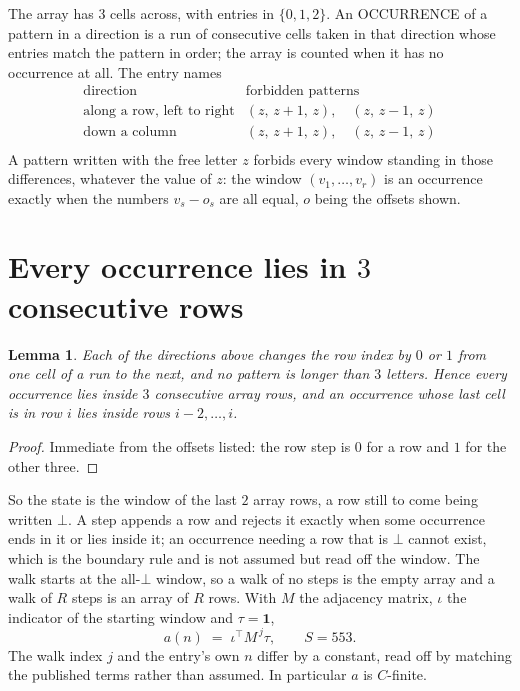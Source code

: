 \documentclass[11pt,a4paper]{article}
\theoremstyle{plain}
\newtheorem{lemma}[theorem]{Lemma}
\theoremstyle{definition}
\begin{document}
The array has $3$ cells across, with entries in $\{0,1,2\}$. An OCCURRENCE of a pattern in a
direction is a run of consecutive cells taken in that direction whose entries match the pattern
in order; the array is counted when it has no occurrence at all. The entry names
\[
\begin{array}{ll}
\text{direction} & \text{forbidden patterns} \\[2pt]
\text{along a row, left to right} & (z,\,z+1,\,z),\quad (z,\,z-1,\,z) \\
\text{down a column} & (z,\,z+1,\,z),\quad (z,\,z-1,\,z) \\
\end{array}
\]
 A pattern written with the free letter $z$ forbids every window standing in those differences, whatever the value of $z$: the window $(v_1,\dots,v_r)$ is an occurrence exactly when the numbers $v_s-o_s$ are all equal, $o$ being the offsets shown.

\section{Every occurrence lies in $3$ consecutive rows}

\begin{lemma}\label{lem:win}
Each of the directions above changes the row index by $0$ or $1$ from one cell of a run to the
next, and no pattern is longer than $3$ letters. Hence every occurrence lies inside $3$
consecutive array rows, and an occurrence whose last cell is in row $i$ lies inside rows
$i-2,\dots,i$.
\end{lemma}

\begin{proof}
Immediate from the offsets listed: the row step is $0$ for a row and $1$ for the other three.
\end{proof}

So the state is the window of the last $2$ array rows, a row still to come being written
$\bot$. A step appends a row and rejects it exactly when some occurrence ends in it or lies
inside it; an occurrence needing a row that is $\bot$ cannot exist, which is the boundary rule
and is not assumed but read off the window. The walk starts at the all-$\bot$ window, so a walk
of no steps is the empty array and a walk of $R$ steps is an array of $R$ rows. With $M$ the
adjacency matrix, $\iota$ the indicator of the starting window and $\tau=\mathbf{1}$,
\[
a(n)\;=\;\iota^{\!\top}M^{\,j}\tau ,\qquad S=553.
\]
The walk index $j$ and the entry's own $n$ differ by a constant, read off by matching the
published terms rather than assumed. In particular $a$ is $C$-finite.
\end{document}
